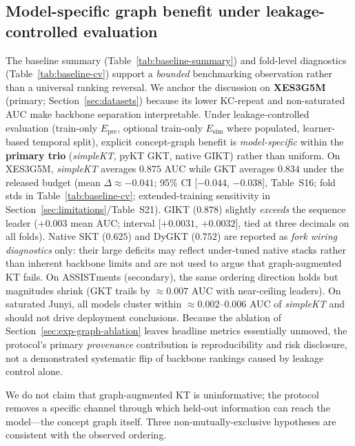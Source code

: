 \documentclass[preprint,10pt,doubleblind]{elsarticle}
\newcommand{\Epre}{\ensuremath{E_{\text{pre}}}}
\newcommand{\Esim}{\ensuremath{E_{\text{sim}}}}
\newcommand{\GKTdeltaci}{[$-0.044$, $-0.038$]}
\newcommand{\GIKTdeltaci}{[$+0.0031$, $+0.0032$]}
\begin{document}
\subsection{Model-specific graph benefit under leakage-controlled evaluation}
\label{sec:disc-model-specific}
The baseline summary (Table~\ref{tab:baseline-summary}) and fold-level
diagnostics (Table~\ref{tab:baseline-cv}) support a \emph{bounded}
benchmarking observation rather than a universal ranking reversal. We anchor
the discussion on \textbf{XES3G5M} (primary; Section~\ref{sec:datasets})
because its lower KC-repeat and non-saturated AUC make backbone separation
interpretable. Under leakage-controlled evaluation (train-only $\Epre$,
optional train-only $\Esim$ where populated, learner-based temporal split),
explicit concept-graph benefit is \emph{model-specific} within the
\textbf{primary trio} (\textit{simpleKT}, pyKT GKT, native GIKT) rather than
uniform. On XES3G5M, \textit{simpleKT} averages $0.875$ AUC while GKT averages
$0.834$ under the released budget (mean $\Delta{\approx}{-}0.041$; 95\% CI
\GKTdeltaci{}, Table~S16; fold stds in Table~\ref{tab:baseline-cv};
extended-training sensitivity in Section~\ref{sec:limitations}/Table~S21).
GIKT ($0.878$) slightly \emph{exceeds}
the sequence leader ($+0.003$ mean AUC; interval \GIKTdeltaci{}, tied at
three decimals on all folds). Native SKT ($0.625$)
and DyGKT ($0.752$) are reported as \emph{fork wiring diagnostics} only: their
large deficits may reflect under-tuned native stacks rather than inherent
backbone limits and are not used to argue that graph-augmented KT fails. On
ASSISTments (secondary), the same ordering direction holds but magnitudes shrink
(GKT trails by ${\approx}0.007$ AUC with near-ceiling leaders). On saturated
Junyi, all models cluster within ${\approx}0.002$--$0.006$ AUC of
\textit{simpleKT} and should not drive deployment conclusions. Because the
ablation of Section~\ref{sec:exp-graph-ablation} leaves headline metrics
essentially unmoved, the protocol's primary \emph{provenance} contribution is
reproducibility and risk disclosure, not a demonstrated systematic flip of
backbone rankings caused by leakage control alone.

We do not claim that graph-augmented KT is uninformative; the protocol
removes a specific channel through which held-out information can reach the
model---the concept graph itself. Three non-mutually-exclusive hypotheses
are consistent with the observed ordering.
\end{document}
